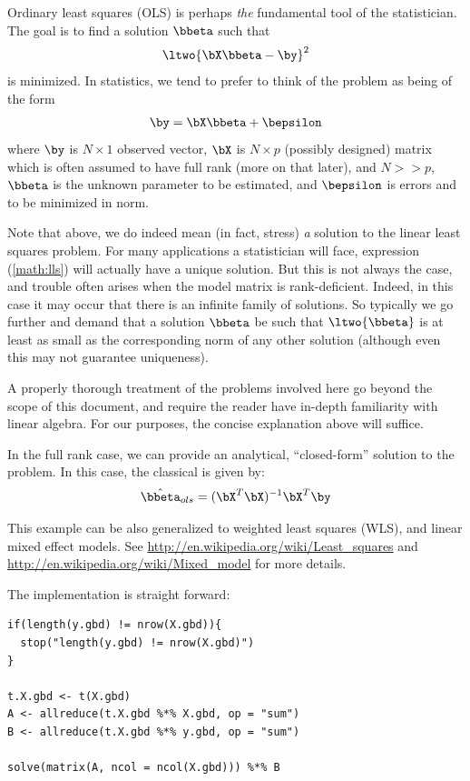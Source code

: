 Ordinary least squares (OLS)
is perhaps \emph{the} fundamental tool of the statistician. The goal is to
find a solution $\bbeta$ such that
\begin{align}
\ltwo{ \bX\bbeta - \by }^2 \label{math:lls}
\end{align}
is minimized. In statistics, we tend to prefer to think of the problem as
being of the form
\begin{align}
\by = \bX\bbeta + \bepsilon \label{math:statslls}
\end{align}
where $\by$ is $N\times 1$ observed vector,
$\bX$ is $N\times p$ (possibly designed) matrix which is often assumed to
have full rank (more on that later), and $N >> p$,
$\bbeta$ is the unknown parameter to be estimated,
and $\bepsilon$ is errors and to be minimized in norm.

Note that above, we do indeed mean (in fact, stress) \emph{a} solution
to the linear least squares problem. For many applications a statistician
will face, expression (\ref{math:lls}) will actually have a unique
solution. But this is not always the case, and trouble often arises when
the model matrix is rank-deficient. Indeed, in this case it may occur
that there is an infinite family of solutions. So typically we go further
and demand that a solution $\bbeta$ be such that $\ltwo{\bbeta}$ is at
least as small as the corresponding norm of any other solution (although
even this may not guarantee uniqueness).

A properly thorough treatment of the problems involved here go beyond the
scope of this document, and require the reader have in-depth familiarity
with linear algebra. For our purposes, the concise explanation above will
suffice.  



In the full rank case, we can provide an analytical, ``closed-form''
solution to the problem.  In this case, the classical
is given by:
\begin{align}
 \hat{\bbeta}_{ols} = (\bX^T\bX)^{-1}\bX^T\by \label{math:ols}
\end{align}
 
This example can be also generalized to weighted least squares (WLS),
and linear mixed effect models.
See \url{http://en.wikipedia.org/wiki/Least_squares} and
\url{http://en.wikipedia.org/wiki/Mixed_model} for more details.

The implementation is straight forward:
\begin{lstlisting}[language=rr,title=R Code]
if(length(y.gbd) != nrow(X.gbd)){
  stop("length(y.gbd) != nrow(X.gbd)")
}

t.X.gbd <- t(X.gbd)
A <- allreduce(t.X.gbd %*% X.gbd, op = "sum")
B <- allreduce(t.X.gbd %*% y.gbd, op = "sum")

solve(matrix(A, ncol = ncol(X.gbd))) %*% B
\end{lstlisting}

